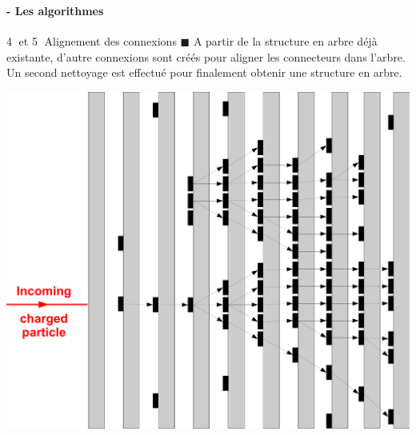 \documentclass[8pt]{beamer}
\begin{document}
  \begin{frame}
  \frametitle{\secname}
  \framesubtitle{\subsecname - Les algorithmes}
    \begin{block}{\textcircled{{\small 4}} et \textcircled{{\small 5}} Alignement des connexions}
      $\blacksquare$ A partir de la structure en arbre déjà existante, d'autre connexions sont créés pour aligner les connecteurs dans l'arbre. Un second nettoyage est effectué pour finalement obtenir une structure en arbre.
    \end{block}
    \begin{center}
      \includegraphics[width=0.6\linewidth]{ConnectorCleaning2.pdf}      
    \end{center}
  \end{frame}
  
\end{document}
